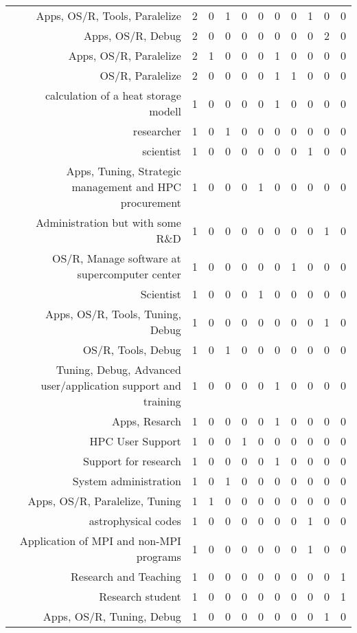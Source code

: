 {\begin{landscape}
\begin{longtable}[htb]{r|c|c|c|c|c|c|c|c|c|c}
{Apps, OS/R, Tools, Paralelize} & 2 & 0 & 1 & 0 & 0 & 0 & 0 & 1 & 0 & 0 \\%
{Apps, OS/R, Debug} & 2 & 0 & 0 & 0 & 0 & 0 & 0 & 0 & 2 & 0 \\%
{Apps, OS/R, Paralelize} & 2 & 1 & 0 & 0 & 0 & 1 & 0 & 0 & 0 & 0 \\%
{OS/R, Paralelize} & 2 & 0 & 0 & 0 & 0 & 1 & 1 & 0 & 0 & 0 \\%
{calculation of a heat storage modell} & 1 & 0 & 0 & 0 & 0 & 1 & 0 & 0 & 0 & 0 \\%
{researcher} & 1 & 0 & 1 & 0 & 0 & 0 & 0 & 0 & 0 & 0 \\%
{scientist} & 1 & 0 & 0 & 0 & 0 & 0 & 0 & 1 & 0 & 0 \\%
{Apps, Tuning, Strategic management and HPC procurement} & 1 & 0 & 0 & 0 & 1 & 0 & 0 & 0 & 0 & 0 \\%
{Administration but with some R\&D} & 1 & 0 & 0 & 0 & 0 & 0 & 0 & 0 & 1 & 0 \\%
{OS/R, Manage software at supercomputer center} & 1 & 0 & 0 & 0 & 0 & 0 & 1 & 0 & 0 & 0 \\%
{Scientist} & 1 & 0 & 0 & 0 & 1 & 0 & 0 & 0 & 0 & 0 \\%
{Apps, OS/R, Tools, Tuning, Debug} & 1 & 0 & 0 & 0 & 0 & 0 & 0 & 0 & 1 & 0 \\%
{OS/R, Tools, Debug} & 1 & 0 & 1 & 0 & 0 & 0 & 0 & 0 & 0 & 0 \\%
{Tuning, Debug, Advanced user/application support and training} & 1 & 0 & 0 & 0 & 0 & 1 & 0 & 0 & 0 & 0 \\%
{Apps, Resarch} & 1 & 0 & 0 & 0 & 0 & 1 & 0 & 0 & 0 & 0 \\%
{HPC User Support} & 1 & 0 & 0 & 1 & 0 & 0 & 0 & 0 & 0 & 0 \\%
{Support for research} & 1 & 0 & 0 & 0 & 0 & 1 & 0 & 0 & 0 & 0 \\%
{System administration} & 1 & 0 & 1 & 0 & 0 & 0 & 0 & 0 & 0 & 0 \\%
{Apps, OS/R, Paralelize, Tuning} & 1 & 1 & 0 & 0 & 0 & 0 & 0 & 0 & 0 & 0 \\%
{astrophysical codes} & 1 & 0 & 0 & 0 & 0 & 0 & 0 & 1 & 0 & 0 \\%
{Application of MPI and non-MPI programs} & 1 & 0 & 0 & 0 & 0 & 0 & 0 & 1 & 0 & 0 \\%
{Research and Teaching} & 1 & 0 & 0 & 0 & 0 & 0 & 0 & 0 & 0 & 1 \\%
{Research student} & 1 & 0 & 0 & 0 & 0 & 0 & 0 & 0 & 0 & 1 \\%
{Apps, OS/R, Tuning, Debug} & 1 & 0 & 0 & 0 & 0 & 0 & 0 & 0 & 1 & 0 \\%

\end{longtable}
\end{landscape}}
